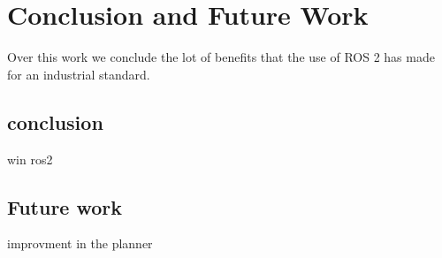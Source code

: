 \part{Conclusion and Future Work}
Over this work we conclude the lot of benefits that the use of ROS 2 has made for an industrial standard.
\chapter{conclusion}
win ros2
\chapter{Future work}
improvment in the planner